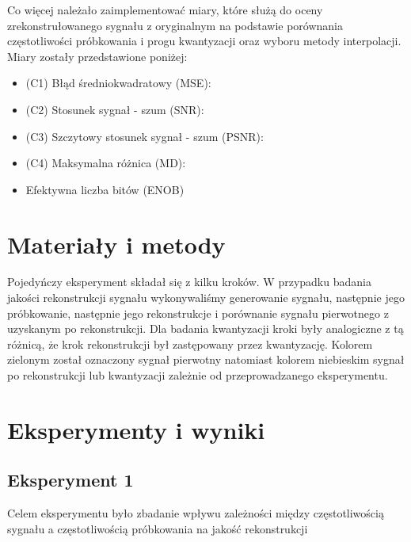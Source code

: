 \documentclass{article}
\begin{document}
Co więcej należało zaimplementować miary, które służą do oceny zrekonstrułowanego
sygnału z oryginalnym na podstawie porównania częstotliwości próbkowania i progu
kwantyzacji oraz wyboru metody interpolacji. Miary zostały przedstawione poniżej:
\begin{itemize}
    \item {
        (C1) Błąd średniokwadratowy (MSE):
    }
    \item {
        (C2) Stosunek sygnał - szum (SNR):
    }
    \item {
        (C3) Szczytowy stosunek sygnał - szum (PSNR):
    }
    \item {
        (C4) Maksymalna różnica (MD):
    }
    \item {
        Efektywna liczba bitów (ENOB)
    }
\end{itemize}

\section{Materiały i metody} {
    Pojedyńczy eksperyment składał się z kilku kroków. W przypadku badania jakości
    rekonstrukcji sygnału wykonywaliśmy generowanie sygnału, następnie jego próbkowanie,
    następnie jego rekonstrukcje i porównanie sygnału pierwotnego z uzyskanym po rekonstrukcji.
    Dla badania kwantyzacji kroki były analogiczne z tą różnicą, że krok rekonstrukcji był zastępowany przez
    kwantyzację. Kolorem zielonym został oznaczony sygnał pierwotny natomiast kolorem niebieskim
    sygnał po rekonstrukcji lub kwantyzacji zależnie od przeprowadzanego eksperymentu.\\
}

\section{Eksperymenty i wyniki}




\subsection{Eksperyment 1}
    Celem eksperymentu było zbadanie wpływu zależności między częstotliwością
    sygnału a częstotliwością próbkowania na jakość rekonstrukcji
\end{document}
